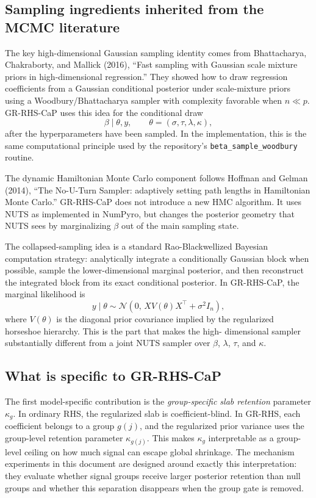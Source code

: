 \documentclass[11pt]{article}
\newcommand{\Norm}{\mathcal{N}}
\begin{document}
\subsection{Sampling ingredients inherited from the MCMC literature}

The key high-dimensional Gaussian sampling identity comes from Bhattacharya,
Chakraborty, and Mallick (2016), ``Fast sampling with Gaussian scale mixture
priors in high-dimensional regression.'' They showed how to draw regression
coefficients from a Gaussian conditional posterior under scale-mixture priors
using a Woodbury/Bhattacharya sampler with complexity favorable when
\(n \ll p\). GR-RHS-CaP uses this idea for the conditional draw
\[
  \beta \mid \theta, y,
  \qquad
  \theta = (\sigma,\tau,\lambda,\kappa),
\]
after the hyperparameters have been sampled. In the implementation, this is
the same computational principle used by the repository's
\texttt{beta\_sample\_woodbury} routine.

The dynamic Hamiltonian Monte Carlo component follows Hoffman and Gelman
(2014), ``The No-U-Turn Sampler: adaptively setting path lengths in
Hamiltonian Monte Carlo.'' GR-RHS-CaP does not introduce a new HMC algorithm.
It uses NUTS as implemented in NumPyro, but changes the posterior geometry that
NUTS sees by marginalizing \(\beta\) out of the main sampling state.

The collapsed-sampling idea is a standard Rao-Blackwellized Bayesian
computation strategy: analytically integrate a conditionally Gaussian block
when possible, sample the lower-dimensional marginal posterior, and then
reconstruct the integrated block from its exact conditional posterior. In
GR-RHS-CaP, the marginal likelihood is
\[
  y \mid \theta \sim
  \Norm\!\left(0,\, X V(\theta) X^\top + \sigma^2 I_n\right),
\]
where \(V(\theta)\) is the diagonal prior covariance implied by the
regularized horseshoe hierarchy. This is the part that makes the high-
dimensional sampler substantially different from a joint NUTS sampler over
\(\beta\), \(\lambda\), \(\tau\), and \(\kappa\).

\subsection{What is specific to GR-RHS-CaP}

The first model-specific contribution is the \emph{group-specific slab
retention} parameter \(\kappa_g\). In ordinary RHS, the regularized slab is
coefficient-blind. In GR-RHS, each coefficient belongs to a group \(g(j)\), and
the regularized prior variance uses the group-level retention parameter
\(\kappa_{g(j)}\). This makes \(\kappa_g\) interpretable as a group-level
ceiling on how much signal can escape global shrinkage. The mechanism
experiments in this document are designed around exactly this interpretation:
they evaluate whether signal groups receive larger posterior retention than
null groups and whether this separation disappears when the group gate is
removed.
\end{document}
